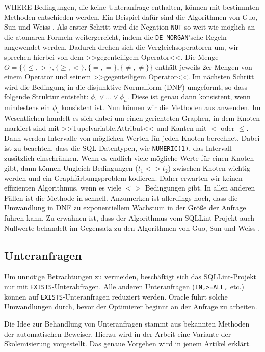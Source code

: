 WHERE-Bedingungen, die keine Unteranfrage enthalten, können mit bestimmten Methoden entschieden werden. Ein Beispiel dafür sind die Algorithmen von Guo, Sun und Weiss \cite{decideable1}. Als erster Schritt wird die Negation \verb|NOT| so weit wie möglich an die atomaren Formeln weitergereicht, indem die \verb|DE-MORGAN|'sche Regeln angewendet werden. Dadurch drehen sich die Vergleichsoperatoren um, wir sprechen hierbei von dem >>gegenteiligem Operator<<. Die Menge $O=\{ \{\leq,>\} , \{\geq,<\} , \{ =, =\}, \{\neq,\neq\} \}$ enthält jeweils 2er Mengen von einem Operator und seinem >>gegenteiligem Operator<<. Im nächsten Schritt wird die Bedingung in die disjunktive Normalform (DNF) umgeformt, so dass folgende Struktur entsteht: $\phi_1 \vee ... \vee \phi_n$. Diese ist genau dann konsistent, wenn mindestens ein $\phi_i$ konsistent ist. Nun können wir die Methoden aus \cite{decideable1} anwenden. Im Wesentlichen handelt es sich dabei um einen gerichteten Graphen, in dem Knoten markiert sind mit >>Tupelvariable.Attribut<< und Kanten mit $<$ oder $\leq$. Dann werden Intervalle von möglichen Werten für jeden Knoten berechnet. Dabei ist zu beachten, dass die SQL-Datentypen, wie \verb|NUMERIC(1)|, das Intervall zusätzlich einschränken.
Wenn es endlich viele mögliche Werte für einen Knoten gibt, dann können Ungleich-Bedingungen ($t_1<>t_2$) zwischen Knoten wichtig werden und ein Graphfärbungsproblem kodieren. Daher erwarten wir keinen effizienten Algorithmus, wenn es viele $<>$ Bedingungen gibt. In allen anderen Fällen ist die Methode in \cite{decideable1} schnell. Anzumerken ist allerdings noch, dass die Umwandlung in DNF zu exponentiellem Wachstum in der Größe der Anfrage führen kann. Zu erwähnen ist, dass der Algorithmus vom SQLLint-Projekt auch Nullwerte behandelt im Gegensatz zu den Algorithmen von Guo, Sun und Weiss \cite{decideable1}.

\subsection{Unteranfragen}

Um unnötige Betrachtungen zu vermeiden, beschäftigt sich das SQLLint-Projekt nur mit \verb|EXISTS|-Unterabfragen. Alle anderen Unteranfragen (\verb|IN,>=ALL,| etc.) können auf \verb|EXISTS|-Unteranfragen reduziert werden. Oracle führt solche Umwandlungen durch, bevor der Optimierer beginnt an der Anfrage zu arbeiten.

Die Idee zur Behandlung von Unteranfragen stammt aus bekannten Methoden der automatischen Beweiser. Hierzu wird in der Arbeit \cite{brass1} eine Variante der Skolemisierung vorgestellt. Das genaue Vorgehen wird in jenem Artikel erklärt.

